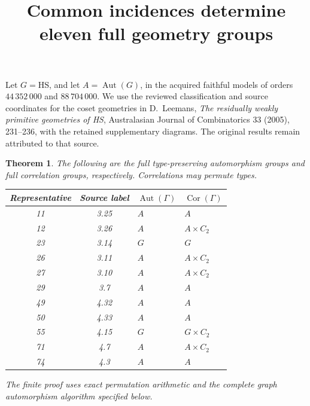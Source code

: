 \documentclass[11pt]{article}
\title{Common incidences determine eleven full geometry groups}
\author{}\date{}
\newtheorem{theorem}{Theorem}\newtheorem{lemma}[theorem]{Lemma}
\newcommand{\Aut}{\operatorname{Aut}}\newcommand{\Cor}{\operatorname{Cor}}
\begin{document}
\maketitle
Let $G=\mathrm{HS}$, and let $A=\Aut(G)$, in the acquired faithful
models of orders $44\,352\,000$ and $88\,704\,000$.
We use the reviewed classification and source coordinates for the
coset geometries in D.~Leemans, \emph{The residually weakly primitive
geometries of HS}, Australasian Journal of Combinatorics 33 (2005),
231--236, with the retained supplementary diagrams.
The original results remain attributed to that source.

\begin{theorem}
The following are the full type-preserving automorphism groups and
full correlation groups, respectively. Correlations may permute types.
\begin{center}
\begin{tabular}{ccll}\toprule
Representative&Source label&$\Aut(\Gamma)$&$\Cor(\Gamma)$\\\midrule
11&3.25&$A$&$A$\\
12&3.26&$A$&$A\times C_2$\\
23&3.14&$G$&$G$\\
26&3.11&$A$&$A\times C_2$\\
27&3.10&$A$&$A\times C_2$\\
29&3.7&$A$&$A$\\
49&4.32&$A$&$A$\\
50&4.33&$A$&$A$\\
55&4.15&$G$&$G\times C_2$\\
71&4.7&$A$&$A\times C_2$\\
74&4.3&$A$&$A$\\\bottomrule
\end{tabular}
\end{center}
The finite proof uses exact permutation arithmetic and the complete
graph automorphism algorithm specified below.
\end{theorem}
\end{document}
